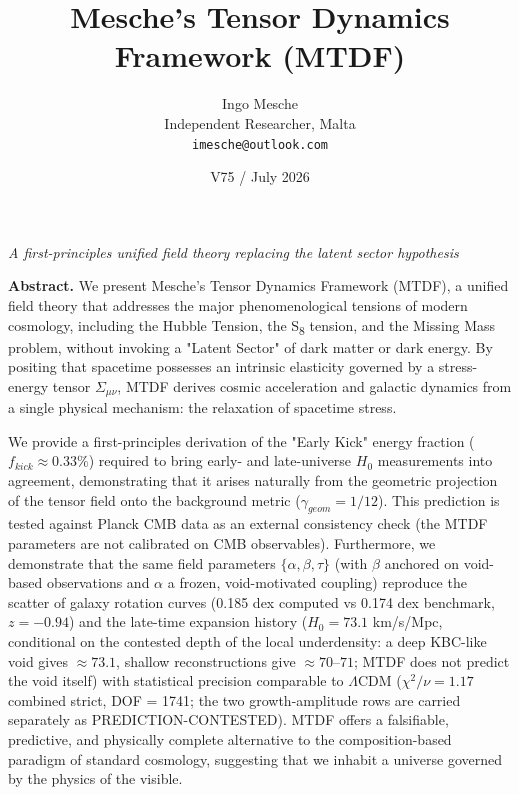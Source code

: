 \documentclass[11pt,a4paper]{article}
\title{Mesche's Tensor Dynamics Framework (MTDF)}
\author{Ingo Mesche\\ \small Independent Researcher, Malta \\ \small \texttt{imesche@outlook.com}}
\date{V75 / July 2026}
\begin{document}
\maketitle
\begin{center}\itshape A first-principles unified field theory replacing the latent sector hypothesis\end{center}



\begin{mdframed}[linecolor=accent,linewidth=0.5pt,backgroundcolor=callout-bg,leftline=true,rightline=true,topline=true,bottomline=true,innerleftmargin=8pt,innerrightmargin=8pt,innertopmargin=6pt,innerbottommargin=6pt]
\textbf{Abstract.} We present Mesche's Tensor Dynamics Framework (MTDF), a unified field theory that addresses the major phenomenological tensions of modern cosmology, including the Hubble Tension, the S\textsubscript{8} tension, and the Missing Mass problem, without invoking a "Latent Sector" of dark matter or dark energy. By positing that spacetime possesses an intrinsic elasticity governed by a stress-energy tensor $\Sigma_{\mu\nu}$, MTDF derives cosmic acceleration and galactic dynamics from a single physical mechanism: the relaxation of spacetime stress.

We provide a first-principles derivation of the "Early Kick" energy fraction ($f_{kick} \approx 0.33\%$) required to bring early- and late-universe $H_0$ measurements into agreement, demonstrating that it arises naturally from the geometric projection of the tensor field onto the background metric ($\gamma_{geom}=1/12$). This prediction is tested against Planck CMB data as an external consistency check (the MTDF parameters are not calibrated on CMB observables). Furthermore, we demonstrate that the same field parameters $\{\alpha, \beta, \tau\}$ (with $\beta$ anchored on void-based observations and $\alpha$ a frozen, void-motivated coupling) reproduce the scatter of galaxy rotation curves (0.185 dex computed vs 0.174 dex benchmark, $z = -0.94$) and the late-time expansion history ($H_0 = 73.1$ km/\allowbreak{}s/\allowbreak{}Mpc, conditional on the contested depth of the local underdensity: a deep KBC-like void gives $\approx 73.1$, shallow reconstructions give $\approx 70$--$71$; MTDF does not predict the void itself) with statistical precision comparable to $\Lambda$CDM ($\chi^2/\nu = 1.17$ combined strict, DOF = 1741; the two growth-amplitude rows are carried separately as PREDICTION-CONTESTED). MTDF offers a falsifiable, predictive, and physically complete alternative to the composition-based paradigm of standard cosmology, suggesting that we inhabit a universe governed by the physics of the visible.


\end{mdframed}
\end{document}
